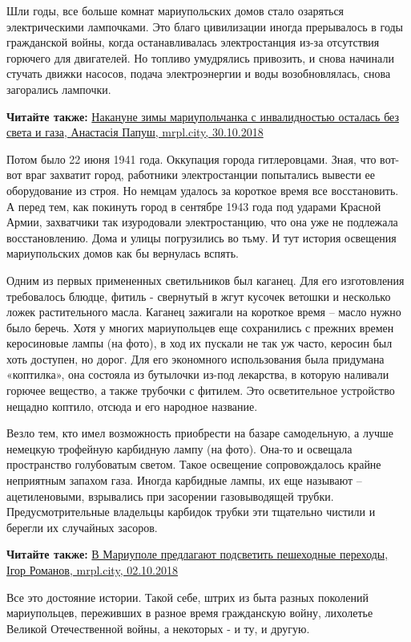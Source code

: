 Шли годы, все больше комнат мариупольских домов стало озаряться электрическими
лампочками. Это благо цивилизации иногда прерывалось в годы гражданской войны,
когда останавливалась электростанция из-за отсутствия горючего для двигателей.
Но топливо умудрялись привозить, и снова начинали стучать движки насосов,
подача электроэнергии и воды возобновлялась, снова загорались лампочки.

\textbf{Читайте также:} \href{https://mrpl.city/news/view/nakanune-zimy-mariupolchanka-invalid-ostalas-bez-sveta-i-gaza}{%
Накануне зимы мариупольчанка с инвалидностью осталась без света и газа, Анастасія Папуш, mrpl.city, 30.10.2018}

Потом было 22 июня 1941 года. Оккупация города гитлеровцами. Зная, что вот-вот
враг захватит город, работники электростанции попытались вывести ее
оборудование из строя. Но немцам удалось за короткое время все восстановить. А
перед тем, как покинуть город в сентябре 1943 года под ударами Красной Армии,
захватчики так изуродовали электростанцию, что она уже не подлежала
восстановлению. Дома и улицы погрузились во тьму. И тут история освещения
мариупольских домов как бы вернулась вспять.


Одним из первых примененных светильников был каганец. Для его изготовления
требовалось блюдце, фитиль - свернутый в жгут кусочек ветошки и несколько ложек
растительного масла. Каганец зажигали на короткое время – масло нужно было
беречь. Хотя у многих мариупольцев еще сохранились с прежних времен керосиновые
лампы (на фото), в ход их пускали не так уж часто, керосин был хоть доступен,
но дорог. Для его экономного использования была придумана «коптилка», она
состояла из бутылочки из-под лекарства, в которую наливали горючее вещество, а
также трубочки с фитилем. Это осветительное устройство нещадно коптило, отсюда
и его народное название.


Везло тем, кто имел возможность приобрести на базаре самодельную, а лучше
немецкую трофейную карбидную лампу (на фото). Она-то и освещала пространство
голубоватым светом. Такое освещение сопровождалось крайне неприятным запахом
газа. Иногда карбидные лампы, их еще называют – ацетиленовыми, взрывались при
засорении газовыводящей трубки. Предусмотрительные владельцы карбидок трубки
эти тщательно чистили и берегли их случайных засоров.

\textbf{Читайте также:} \href{https://mrpl.city/news/view/v-mariupole-predlagayut-podsvetit-peshehodnye-perehody}{%
В Мариуполе предлагают подсветить пешеходные переходы, Ігор Романов, mrpl.city, 02.10.2018}

Все это достояние истории. Такой себе, штрих из быта разных поколений
мариупольцев, переживших в разное время гражданскую войну, лихолетье Великой
Отечественной войны, а некоторых - и ту, и другую.
